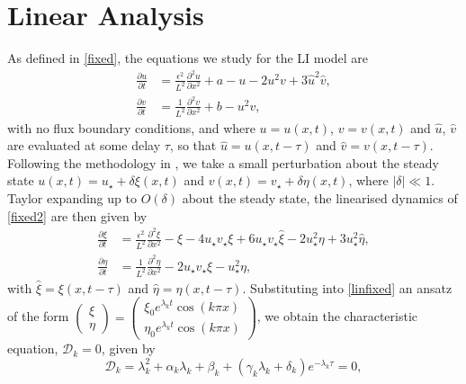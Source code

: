 \section{Linear Analysis}
As defined in \eqref{fixed}, the equations we study for the LI model are
\begin{equation}\label{fixed2}
  \begin{split}
  \frac{\partial u}{\partial t}&=\frac{\epsilon^2}{L^2}\frac{\partial^2u}{\partial x^2}+a-u-2u^2v+3\hat{u}^2\hat{v},\\
  \frac{\partial v}{\partial t}&=\frac{1}{L^2}\frac{\partial^2v}{\partial x^2}+b-u^2v,
\end{split}
\end{equation}
with no flux boundary conditions, and where $u=u(x,t)$, $v=v(x,t)$ and $\hat{u}$, $\hat{v}$ are evaluated at some delay $\tau$, so that $\hat{u}=u(x,t-\tau)$ and $\hat{v}=v(x,t-\tau)$. Following the methodology in \cite{yigaffneyli}, we take a small perturbation about the steady state $u(x,t)=u_\star+\delta\xi(x,t)$ and $v(x,t)=v_\star+\delta\eta(x,t)$, where $|\delta|\ll 1$. Taylor expanding up to $O(\delta)$ about the steady state, the linearised dynamics of \eqref{fixed2} are then given by
\begin{equation}\label{linfixed}
  \begin{split}
\frac{\partial\xi}{\partial t}&=\frac{\epsilon^2}{L^2}\frac{\partial^2\xi}{\partial x^2}-\xi-4u_\star v_\star\xi+6u_\star v_\star\hat{\xi}-2u_\star^2\eta+3u_\star^2\hat{\eta},\\
\frac{\partial\eta}{\partial t}&=\frac{1}{L^2}\frac{\partial^2\eta}{\partial x^2}-2u_\star v_\star\xi-u_\star^2\eta,
\end{split}
\end{equation}
with $\hat{\xi}=\xi(x,t-\tau)$ and $\hat{\eta}=\eta(x,t-\tau)$. Substituting into \eqref{linfixed} an ansatz of the form $\begin{pmatrix}\xi\\\eta\end{pmatrix}=\begin{pmatrix}\xi_0e^{\lambda_k t}\cos(k\pi x)\\ \eta_0e^{\lambda_k t}\cos(k\pi x)\end{pmatrix}$, we obtain the characteristic equation, $\mathcal{D}_k=0$, given by
\begin{equation}\label{characfix}
\mathcal{D}_k=\lambda_k^2+\alpha_k\lambda_k+\beta_k+(\gamma_k\lambda_k+\delta_k)e^{-\lambda_k\tau}=0,
\end{equation}
